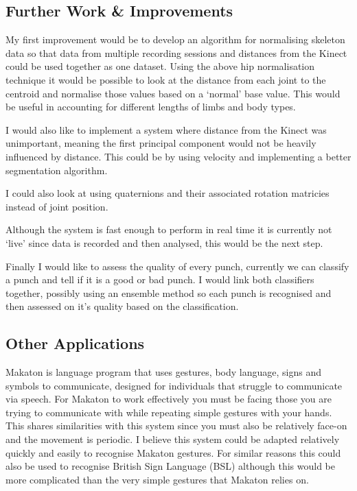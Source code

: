 \subsection{Further Work \& Improvements}
My first improvement would be to develop an algorithm for normalising skeleton data so that data from multiple recording sessions and distances from the Kinect could be used together as one dataset. Using the above hip normalisation technique it would be possible to look at the distance from each joint to the centroid and normalise those values based on a `normal' base value. This would be useful in accounting for different lengths of limbs and body types. 

I would also like to implement a system where distance from the Kinect was unimportant, meaning the first principal component would not be heavily influenced by distance. This could be by using velocity and implementing a better segmentation algorithm.

I could also look at using quaternions and their associated rotation matricies instead of joint position.

Although the system is fast enough to perform in real time it is currently not `live' since data is recorded and then analysed, this would be the next step. 

Finally I would like to assess the quality of every punch, currently we can classify a punch and tell if it is a good or bad punch. I would link both classifiers together, possibly using an ensemble method so each punch is recognised and then assessed on it's quality based on the classification.

\subsection{Other Applications}
Makaton is language program that uses gestures, body language, signs and symbols to communicate, designed for individuals that struggle to communicate via speech.\cite{MAKATON} \cite{MAKATONwiki} For Makaton to work effectively you must be facing those you are trying to communicate with while repeating simple gestures with your hands. This shares similarities with this system since you must also be relatively face-on and the movement is periodic. I believe this system could be adapted relatively quickly and easily to recognise Makaton gestures. For similar reasons this could also be used to recognise British Sign Language (BSL) although this would be more complicated than the very simple gestures that Makaton relies on.

